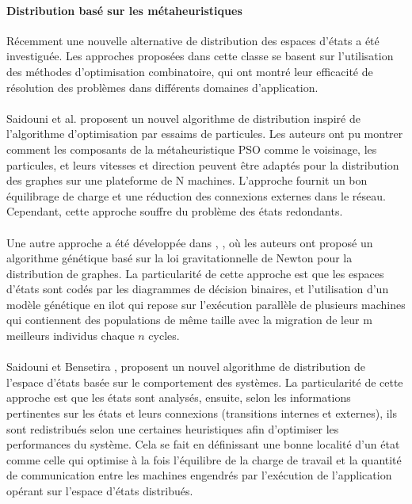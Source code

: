  \paragraph{Distribution basé sur les métaheuristiques}
Récemment une nouvelle alternative de distribution des espaces d'états a été investiguée. Les approches proposées dans cette classe se basent sur l'utilisation des méthodes d'optimisation combinatoire, qui ont montré leur efficacité de résolution des problèmes dans différents domaines d'application.
 \\\\ 
Saidouni et al. \citep{Saidouni2012} proposent un nouvel algorithme de distribution inspiré de l'algorithme d'optimisation par essaims de particules. Les auteurs ont pu montrer comment les composants de la métaheuristique PSO comme le voisinage, les particules, et leurs vitesses et direction peuvent être adaptés pour la distribution des graphes sur une plateforme de N machines. L'approche fournit un bon équilibrage de charge et une réduction des connexions externes dans le réseau. Cependant, cette approche souffre du problème des états redondants.
\\\\
Une autre approche a été développée dans  \citep{TabibSaidouni2016},  \citep{Tabib2017}, où les auteurs ont proposé un algorithme génétique basé sur la loi gravitationnelle de Newton pour la distribution de graphes. La particularité de cette approche est que les espaces d'états sont codés par les diagrammes de décision binaires, et l'utilisation d'un modèle génétique en ilot qui repose sur l'exécution parallèle de plusieurs machines qui contiennent des populations de même taille avec la migration de leur m meilleurs individus chaque $n$ cycles.
\\\\
Saidouni et Bensetira \citep{BENSETIRA2017}, proposent un nouvel algorithme de distribution de l'espace d'états basée sur le comportement des systèmes. La particularité de cette approche est que les états sont analysés, ensuite, selon les informations pertinentes sur les états et leurs connexions (transitions internes et externes), ils sont redistribués selon une certaines heuristiques afin d'optimiser les performances
du système. Cela se fait en définissant une bonne localité d'un état comme celle qui optimise à la fois l'équilibre de la charge de travail et la quantité de communication entre les machines engendrés par l'exécution de l'application opérant sur l'espace d'états distribués.